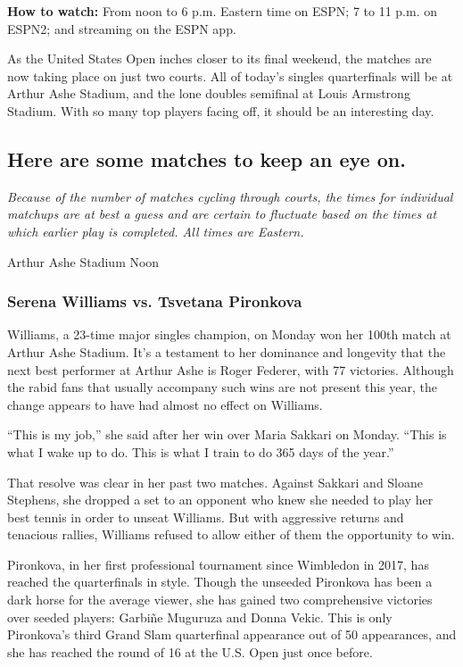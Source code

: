 \textbf{How to watch:} From noon to 6 p.m. Eastern time on ESPN; 7 to 11
p.m. on ESPN2; and streaming on the ESPN app.

As the United States Open inches closer to its final weekend, the
matches are now taking place on just two courts. All of today's singles
quarterfinals will be at Arthur Ashe Stadium, and the lone doubles
semifinal at Louis Armstrong Stadium. With so many top players facing
off, it should be an interesting day.

\hypertarget{here-are-some-matches-to-keep-an-eye-on}{%
\subsection{Here are some matches to keep an eye
on.}\label{here-are-some-matches-to-keep-an-eye-on}}

\emph{Because of the number of matches cycling through courts, the times
for individual matchups are at best a guess and are certain to fluctuate
based on the times at which earlier play is completed. All times are
Eastern.}

Arthur Ashe Stadium \textbar{} Noon

\hypertarget{serena-williams-vs-tsvetana-pironkova}{%
\subsubsection{\texorpdfstring{\textbf{Serena Williams vs. Tsvetana
Pironkova}}{Serena Williams vs. Tsvetana Pironkova}}\label{serena-williams-vs-tsvetana-pironkova}}

Williams, a 23-time major singles champion, on Monday won her 100th
match at Arthur Ashe Stadium. It's a testament to her dominance and
longevity that the next best performer at Arthur Ashe is Roger Federer,
with 77 victories. Although the rabid fans that usually accompany such
wins are not present this year, the change appears to have had almost no
effect on Williams.

``This is my job,'' she said after her win over Maria Sakkari on Monday.
``This is what I wake up to do. This is what I train to do 365 days of
the year.''

That resolve was clear in her past two matches. Against Sakkari and
Sloane Stephens, she dropped a set to an opponent who knew she needed to
play her best tennis in order to unseat Williams. But with aggressive
returns and tenacious rallies, Williams refused to allow either of them
the opportunity to win.

Pironkova, in her first professional tournament since Wimbledon in 2017,
has reached the quarterfinals in style. Though the unseeded Pironkova
has been a dark horse for the average viewer, she has gained two
comprehensive victories over seeded players: Garbiñe Muguruza and Donna
Vekic. This is only Pironkova's third Grand Slam quarterfinal appearance
out of 50 appearances, and she has reached the round of 16 at the U.S.
Open just once before.

